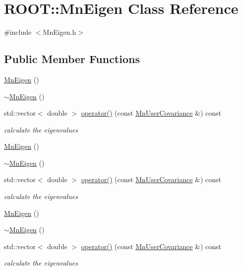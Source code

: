 \hypertarget{classROOT_1_1Minuit2_1_1MnEigen}{}\section{R\+O\+OT\+:\+:Mn\+Eigen Class Reference}
\label{classROOT_1_1Minuit2_1_1MnEigen}


{\ttfamily \#include $<$Mn\+Eigen.\+h$>$}

\subsection*{Public Member Functions}
\begin{DoxyCompactItemize}
\item 
\mbox{\hyperlink{classROOT_1_1Minuit2_1_1MnEigen_a712f43d98a8d51bd585889185d424fba}{Mn\+Eigen}} ()
\item 
\mbox{\hyperlink{classROOT_1_1Minuit2_1_1MnEigen_a1c3b3cbc2976616c779f394121798093}{$\sim$\+Mn\+Eigen}} ()
\item 
std\+::vector$<$ double $>$ \mbox{\hyperlink{classROOT_1_1Minuit2_1_1MnEigen_aba6999f348c2cbc8055528faf207b7d6}{operator()}} (const \mbox{\hyperlink{classROOT_1_1Minuit2_1_1MnUserCovariance}{Mn\+User\+Covariance}} \&) const
\begin{DoxyCompactList}\small\item\em calculate the eigenvalues \end{DoxyCompactList}\item 
\mbox{\hyperlink{classROOT_1_1Minuit2_1_1MnEigen_a712f43d98a8d51bd585889185d424fba}{Mn\+Eigen}} ()
\item 
\mbox{\hyperlink{classROOT_1_1Minuit2_1_1MnEigen_a1c3b3cbc2976616c779f394121798093}{$\sim$\+Mn\+Eigen}} ()
\item 
std\+::vector$<$ double $>$ \mbox{\hyperlink{classROOT_1_1Minuit2_1_1MnEigen_aba021c8f81549aae00ad600c3d3c2f93}{operator()}} (const \mbox{\hyperlink{classROOT_1_1Minuit2_1_1MnUserCovariance}{Mn\+User\+Covariance}} \&) const
\begin{DoxyCompactList}\small\item\em calculate the eigenvalues \end{DoxyCompactList}\item 
\mbox{\hyperlink{classROOT_1_1Minuit2_1_1MnEigen_a712f43d98a8d51bd585889185d424fba}{Mn\+Eigen}} ()
\item 
\mbox{\hyperlink{classROOT_1_1Minuit2_1_1MnEigen_a1c3b3cbc2976616c779f394121798093}{$\sim$\+Mn\+Eigen}} ()
\item 
std\+::vector$<$ double $>$ \mbox{\hyperlink{classROOT_1_1Minuit2_1_1MnEigen_aba021c8f81549aae00ad600c3d3c2f93}{operator()}} (const \mbox{\hyperlink{classROOT_1_1Minuit2_1_1MnUserCovariance}{Mn\+User\+Covariance}} \&) const
\begin{DoxyCompactList}\small\item\em calculate the eigenvalues \end{DoxyCompactList}\end{DoxyCompactItemize}


